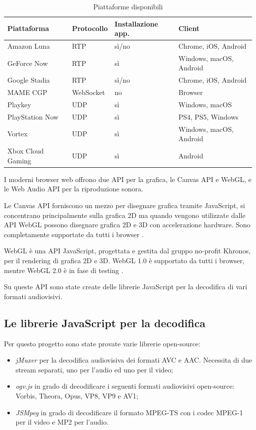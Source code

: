 \begin{table}[H]
	\centering
	\begin{tabular}{||l l l l||} 
		\hline
		Piattaforma & Protocollo & Installazione app. & Client \\
		\hline\hline
		Amazon Luna & RTP & sì/no & Chrome, iOS, Android \\
		\hline
		GeForce Now & RTP & sì & Windows, macOS, Android \\
		\hline
		Google Stadia & RTP & sì/no & Chrome, iOS, Android \\
		\hline
		MAME CGP & WebSocket & no & Browser \\
		\hline
		Playkey & UDP & sì & Windows, macOS \\
		\hline
		PlayStation Now & UDP & sì & PS4, PS5, Windows \\
		\hline
		Vortex & UDP & sì & Windows, macOS, Android \\
		\hline		
		Xbox Cloud Gaming & UDP & sì & Android \\
		\hline
	\end{tabular}

	\caption{Piattaforme disponibili}
	\label{table:ClientPerCloudGaming}
\end{table}

I moderni browser web offrono due API per la grafica, le Canvas API e WebGL, e le Web Audio API per la riproduzione sonora.

Le Canvas API forniscono un mezzo per disegnare grafica tramite JavaScript, si concentrano principalmente sulla grafica 2D ma quando vengono utilizzate dalle API WebGL possono disegnare grafica 2D e 3D con accelerazione hardware. Sono completamente supportate da tutti i browser \parencite{Canvas_API}.

WebGL è una API JavaScript, progettata e gestita dal gruppo no-profit Khronos, per il rendering di grafica 2D e 3D. WebGL 1.0 è supportato da tutti i browser, mentre WebGL 2.0 è in fase di testing \parencite{WebGL}.

Su queste API sono state create delle librerie JavaScript per la decodifica di vari formati audiovisivi.

\subsection{Le librerie JavaScript per la decodifica} \label{subsec:chap3_LibJavascript}
Per questo progetto sono state provate varie librerie open-source:

\begin{itemize}
	\item \textit{jMuxer} per la decodifica audiovisiva dei formati AVC e AAC. Necessita di due stream separati, uno per l'audio ed uno per il video;	
	\item \textit{ogv.js} in grado di decodificare i seguenti formati audiovisivi open-source: Vorbis, Theora, Opus, VP8, VP9 e AV1;
	\item \textit{JSMpeg} in grado di decodificare il formato MPEG-TS con i codec MPEG-1 per il video e MP2 per l'audio.
\end{itemize}


